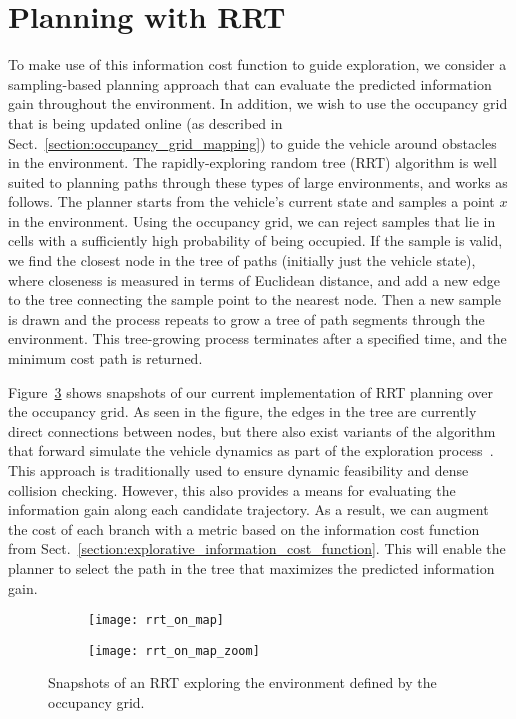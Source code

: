 \section{Planning with RRT}
\label{sec:planner}

To make use of this information cost function to guide exploration, we consider a sampling-based planning approach that can evaluate the predicted information gain throughout the environment. In addition, we wish to use the occupancy grid that is being updated online (as described in Sect.~\ref{section:occupancy_grid_mapping}) to guide the vehicle around obstacles in the environment. The rapidly-exploring random tree (RRT) algorithm is well suited to planning paths through these types of large environments, and works as follows.
The planner starts from the vehicle's current state and samples a point $x$ in the environment. Using the occupancy grid, we can reject samples that lie in cells with a sufficiently high probability of being occupied. If the sample is valid, we find the closest node in the tree of paths (initially just the vehicle state), where closeness is measured in terms of Euclidean distance, and add a new edge to the tree connecting the sample point to the nearest node.
Then a new sample is drawn and the process repeats to grow a tree of path segments through the environment. This tree-growing process terminates after a specified time, and the minimum cost path is returned.

Figure~\ref{fig:rrt_on_slam_map} shows snapshots of our current implementation of RRT planning over the occupancy grid. As seen in the figure, the edges in the tree are currently direct connections between nodes, but there also exist variants of the algorithm that forward simulate the vehicle dynamics as part of the exploration process~\cite{Kuwata09_TCST}. This approach is traditionally used to ensure dynamic feasibility and dense collision checking. However, this also provides a means for evaluating the information gain along each candidate trajectory. As a result, we can augment the cost of each branch with a metric based on the information cost function from Sect.~\ref{section:explorative_information_cost_function}. This will enable the planner to select the path in the tree that maximizes the predicted information gain.

\begin{figure}[t]
\centering
\begin{subfigure}[b]{0.49\linewidth}
\texttt{[image: rrt\_on\_map]}
\label{fig:rrt_on_map}
\end{subfigure}
\begin{subfigure}[b]{0.49\linewidth}
\texttt{[image: rrt\_on\_map\_zoom]}
\label{fig:rrt_on_map_zoom}
\end{subfigure}
\caption{Snapshots of an RRT exploring the environment defined by the occupancy grid. \label{fig:rrt_on_slam_map}}
\end{figure}
